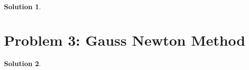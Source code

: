 \documentclass{article}
\theoremstyle{definition}
\newtheorem{solution}{Solution}
\begin{document}
\begin{solution}

\end{solution}




\section{Problem 3: Gauss Newton Method}



\begin{solution}


\end{solution}
\end{document}
